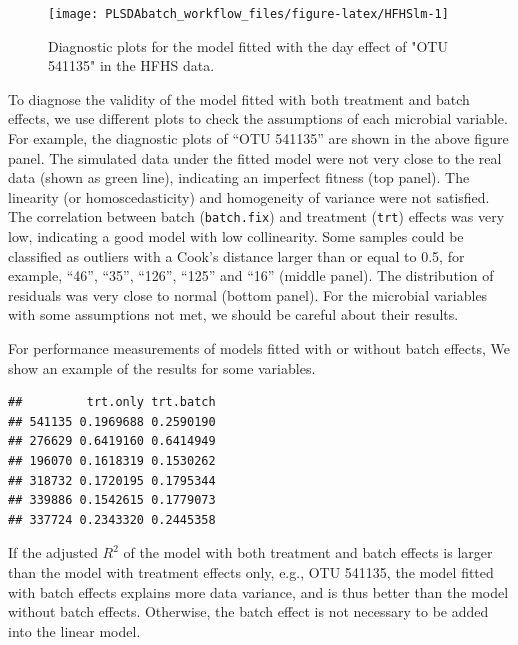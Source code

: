 \documentclass[
]{book}
\newenvironment{Shaded}{\begin{snugshade}}{\end{snugshade}}
\newcommand{\FunctionTok}[1]{\textcolor[rgb]{0.00,0.00,0.00}{#1}}
\newcommand{\NormalTok}[1]{#1}
\newcommand{\SpecialCharTok}[1]{\textcolor[rgb]{0.00,0.00,0.00}{#1}}
\begin{document}
\begin{figure}

{\centering \texttt{[image: PLSDAbatch\_workflow\_files/figure-latex/HFHSlm-1]} 

}

\caption{Diagnostic plots for the model fitted with the day effect of "OTU 541135" in the HFHS data.}\label{fig:HFHSlm}
\end{figure}

To diagnose the validity of the model fitted with both treatment and batch effects, we use different plots to check the assumptions of each microbial variable. For example, the diagnostic plots of ``OTU 541135'' are shown in the above figure panel. The simulated data under the fitted model were not very close to the real data (shown as green line), indicating an imperfect fitness (top panel). The linearity (or homoscedasticity) and homogeneity of variance were not satisfied. The correlation between batch (\texttt{batch.fix}) and treatment (\texttt{trt}) effects was very low, indicating a good model with low collinearity. Some samples could be classified as outliers with a Cook's distance larger than or equal to 0.5, for example, ``46'', ``35'', ``126'', ``125'' and ``16'' (middle panel). The distribution of residuals was very close to normal (bottom panel). For the microbial variables with some assumptions not met, we should be careful about their results.

For performance measurements of models fitted with or without batch effects, We show an example of the results for some variables.

\begin{Shaded}
\end{Shaded}

\begin{verbatim}
##         trt.only trt.batch
## 541135 0.1969688 0.2590190
## 276629 0.6419160 0.6414949
## 196070 0.1618319 0.1530262
## 318732 0.1720195 0.1795344
## 339886 0.1542615 0.1779073
## 337724 0.2343320 0.2445358
\end{verbatim}

If the adjusted \(R^2\) of the model with both treatment and batch effects is larger than the model with treatment effects only, e.g., OTU 541135, the model fitted with batch effects explains more data variance, and is thus better than the model without batch effects. Otherwise, the batch effect is not necessary to be added into the linear model.
\end{document}
